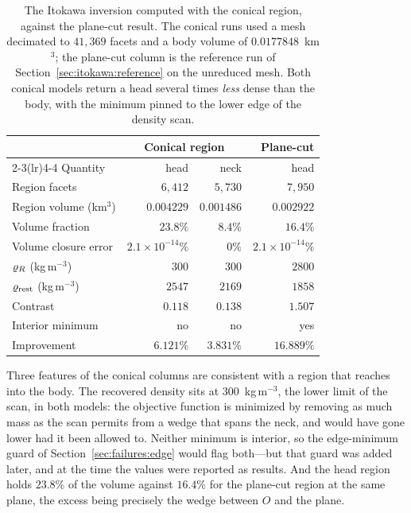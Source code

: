 \begin{table}[htbp]
\centering
\small
\caption{The Itokawa inversion computed with the conical region, against the
plane-cut result. The conical runs used a mesh decimated to $41{,}369$ facets
and a body volume of $0.0177848$~km$^{3}$; the plane-cut column is the
reference run of Section~\ref{sec:itokawa:reference} on the unreduced mesh.
Both conical models return a head several times \emph{less} dense than the
body, with the minimum pinned to the lower edge of the density scan.}
\label{tab:appcone}
\begin{tabular}{lrrr}
\toprule
 & \multicolumn{2}{c}{Conical region} & Plane-cut \\
\cmidrule(lr){2-3}\cmidrule(lr){4-4}
Quantity & head & neck & head \\
\midrule
Region facets            & $6{,}412$ & $5{,}730$ & $7{,}950$ \\
Region volume (km$^3$)   & $0.004229$ & $0.001486$ & $0.002922$ \\
Volume fraction          & $23.8\%$ & $8.4\%$ & $16.4\%$ \\
Volume closure error     & $2.1\times10^{-14}\%$ & $0\%$ & $2.1\times10^{-14}\%$ \\
$\varrho_{R}$ (kg\,m$^{-3}$)  & $300$ & $300$ & $2800$ \\
$\varrho_{\mathrm{rest}}$ (kg\,m$^{-3}$) & $2547$ & $2169$ & $1858$ \\
Contrast                 & $0.118$ & $0.138$ & $1.507$ \\
Interior minimum         & no & no & yes \\
Improvement              & $6.121\%$ & $3.831\%$ & $16.889\%$ \\
\bottomrule
\end{tabular}
\end{table}

Three features of the conical columns are consistent with a region that reaches
into the body. The recovered density sits at $300$~kg\,m$^{-3}$, the lower
limit of the scan, in both models: the objective function is minimized by
removing as much mass as the scan permits from a wedge that spans the neck, and
would have gone lower had it been allowed to. Neither minimum is interior, so
the edge-minimum guard of Section~\ref{sec:failures:edge} would flag both---but
that guard was added later, and at the time the values were reported as
results. And the head region holds $23.8\%$ of the volume against $16.4\%$ for
the plane-cut region at the same plane, the excess being precisely the wedge
between $O$ and the plane.

